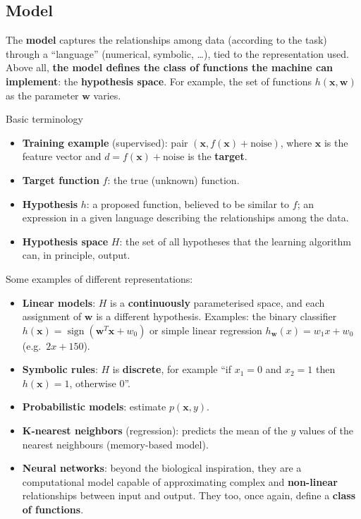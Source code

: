 \subsection{Model}\label{modello}

The \textbf{model} captures the relationships among data (according to
the task) through a ``language'' (numerical, symbolic, \ldots), tied to
the representation used. Above all, \textbf{the model defines the class
of functions the machine can implement}: the \textbf{hypothesis space}.
For example, the set of functions \(h(\mathbf{x}, \mathbf{w})\) as the
parameter \(\mathbf{w}\) varies.

\begin{boxdefinition}{Basic terminology}

\begin{itemize}
\tightlist
\item
  \textbf{Training example} (supervised): pair
  \((\mathbf{x}, f(\mathbf{x}) + \text{noise})\), where \(\mathbf{x}\)
  is the feature vector and \(d = f(\mathbf{x}) + \text{noise}\) is the
  \textbf{target}.
\item
  \textbf{Target function} \(f\): the true (unknown) function.
\item
  \textbf{Hypothesis} \(h\): a proposed function, believed to be
  similar to \(f\); an expression in a given language describing the
  relationships among the data.
\item
  \textbf{Hypothesis space} \(H\): the set of all hypotheses that the
  learning algorithm can, in principle, output.
\end{itemize}

\end{boxdefinition}

Some examples of different representations:

\begin{itemize}
\tightlist
\item
  \textbf{Linear models}: \(H\) is a \textbf{continuously}
  parameterised space, and each assignment of \(\mathbf{w}\) is a
  different hypothesis. Examples: the binary classifier
  \(h(\mathbf{x}) = \operatorname{sign}(\mathbf{w}^T\mathbf{x} + w_0)\)
  or simple linear regression \(h_\mathbf{w}(x) = w_1 x + w_0\)
  (e.g.\ \(2x + 150\)).
\item
  \textbf{Symbolic rules}: \(H\) is \textbf{discrete}, for example ``if
  \(x_1 = 0\) and \(x_2 = 1\) then \(h(\mathbf{x}) = 1\), otherwise
  \(0\)''.
\item
  \textbf{Probabilistic models}: estimate \(p(\mathbf{x}, y)\).
\item
  \textbf{K-nearest neighbors} (regression): predicts the mean of the
  \(y\) values of the nearest neighbours (memory-based model).
\item
  \textbf{Neural networks}: beyond the biological inspiration, they are
  a computational model capable of approximating complex and
  \textbf{non-linear} relationships between input and output. They too,
  once again, define a \textbf{class of functions}.
\end{itemize}

